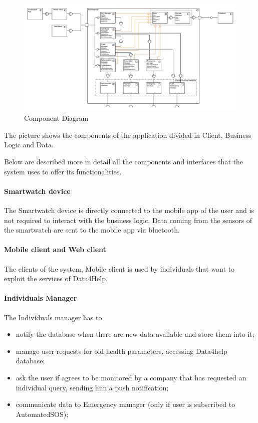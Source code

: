 \begin{figure}[H]
	\includegraphics[width=\textwidth,height=\textheight,keepaspectratio]{assets/ComponentDiagram.pdf}
	\caption{Component Diagram}
	\label{fig:CD}
\end{figure}


\noindent The picture shows the components of the application divided in Client, Business Logic and Data.

Below are described more in detail all the components and interfaces that the system uses to offer its functionalities.

\paragraph{Smartwatch device} \mbox{} \newline
The Smartwatch device is directly connected to the mobile app of the user and is not required to interact with the business logic.
Data coming from the sensors of the smartwatch are sent to the mobile app via bluetooth.

\paragraph{Mobile client and Web client} \mbox{} \newline
The clients of the system, 
Mobile client is used by individuals that want to exploit the services of Data4Help.

\paragraph{Individuals Manager} \mbox{} \newline
The Individuals manager has to 
\begin{itemize}
    \item notify the database when there are new data available and store them into it;
    \item manage user requests for old health parameters, accessing Data4help database;
    \item ask the user if agrees to be monitored by a company that has requested an individual query, sending him a push notification;
    \item communicate data to Emergency manager (only if user is subscribed to AutomatedSOS);
\end{itemize}


